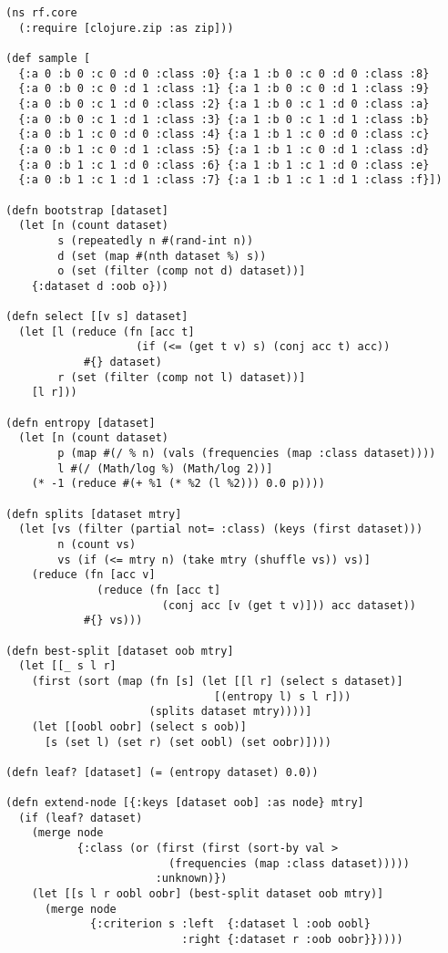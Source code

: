 \documentclass[a4paper,man,12pt,apacite,floatsintext,draftfirst]{apa6} %
\begin{document}
\begin{framed}
\begin{verbatim}
(ns rf.core
  (:require [clojure.zip :as zip]))

(def sample [
  {:a 0 :b 0 :c 0 :d 0 :class :0} {:a 1 :b 0 :c 0 :d 0 :class :8}
  {:a 0 :b 0 :c 0 :d 1 :class :1} {:a 1 :b 0 :c 0 :d 1 :class :9}
  {:a 0 :b 0 :c 1 :d 0 :class :2} {:a 1 :b 0 :c 1 :d 0 :class :a}
  {:a 0 :b 0 :c 1 :d 1 :class :3} {:a 1 :b 0 :c 1 :d 1 :class :b}
  {:a 0 :b 1 :c 0 :d 0 :class :4} {:a 1 :b 1 :c 0 :d 0 :class :c}
  {:a 0 :b 1 :c 0 :d 1 :class :5} {:a 1 :b 1 :c 0 :d 1 :class :d}
  {:a 0 :b 1 :c 1 :d 0 :class :6} {:a 1 :b 1 :c 1 :d 0 :class :e}
  {:a 0 :b 1 :c 1 :d 1 :class :7} {:a 1 :b 1 :c 1 :d 1 :class :f}])

(defn bootstrap [dataset]
  (let [n (count dataset)
        s (repeatedly n #(rand-int n))
        d (set (map #(nth dataset %) s))
        o (set (filter (comp not d) dataset))]
    {:dataset d :oob o}))

(defn select [[v s] dataset]
  (let [l (reduce (fn [acc t]
                    (if (<= (get t v) s) (conj acc t) acc))
            #{} dataset)
        r (set (filter (comp not l) dataset))]
    [l r]))

(defn entropy [dataset]
  (let [n (count dataset)
        p (map #(/ % n) (vals (frequencies (map :class dataset))))
        l #(/ (Math/log %) (Math/log 2))]
    (* -1 (reduce #(+ %1 (* %2 (l %2))) 0.0 p))))

(defn splits [dataset mtry]
  (let [vs (filter (partial not= :class) (keys (first dataset)))
        n (count vs)
        vs (if (<= mtry n) (take mtry (shuffle vs)) vs)]
    (reduce (fn [acc v]
              (reduce (fn [acc t]
                        (conj acc [v (get t v)])) acc dataset))
            #{} vs)))

(defn best-split [dataset oob mtry]
  (let [[_ s l r]
    (first (sort (map (fn [s] (let [[l r] (select s dataset)]
                                [(entropy l) s l r]))
                      (splits dataset mtry))))]
    (let [[oobl oobr] (select s oob)]
      [s (set l) (set r) (set oobl) (set oobr)])))

(defn leaf? [dataset] (= (entropy dataset) 0.0))

(defn extend-node [{:keys [dataset oob] :as node} mtry]
  (if (leaf? dataset)
    (merge node
           {:class (or (first (first (sort-by val >
                         (frequencies (map :class dataset)))))
                       :unknown)})
    (let [[s l r oobl oobr] (best-split dataset oob mtry)]
      (merge node
             {:criterion s :left  {:dataset l :oob oobl}
                           :right {:dataset r :oob oobr}}))))


\end{verbatim}
\end{framed}
\end{document}
